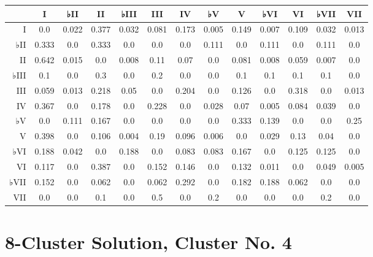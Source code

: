 \begin{table}[htbp]
\begin{minipage}{\linewidth}
\setlength{\tymax}{0.5\linewidth}
\centering
\small
\begin{tabulary}{\textwidth}{@{}RCCCCCCCCCCCC@{}} \toprule
&I&♭II&II&♭III&III&IV&♭V&V&♭VI&VI&♭VII&VII\\
\midrule
I&0.0&0.022&0.377&0.032&0.081&0.173&0.005&0.149&0.007&0.109&0.032&0.013\\
♭II&0.333&0.0&0.333&0.0&0.0&0.0&0.111&0.0&0.111&0.0&0.111&0.0\\
II&0.642&0.015&0.0&0.008&0.11&0.07&0.0&0.081&0.008&0.059&0.007&0.0\\
♭III&0.1&0.0&0.3&0.0&0.2&0.0&0.0&0.1&0.1&0.1&0.1&0.0\\
III&0.059&0.013&0.218&0.05&0.0&0.204&0.0&0.126&0.0&0.318&0.0&0.013\\
IV&0.367&0.0&0.178&0.0&0.228&0.0&0.028&0.07&0.005&0.084&0.039&0.0\\
♭V&0.0&0.111&0.167&0.0&0.0&0.0&0.0&0.333&0.139&0.0&0.0&0.25\\
V&0.398&0.0&0.106&0.004&0.19&0.096&0.006&0.0&0.029&0.13&0.04&0.0\\
♭VI&0.188&0.042&0.0&0.188&0.0&0.083&0.083&0.167&0.0&0.125&0.125&0.0\\
VI&0.117&0.0&0.387&0.0&0.152&0.146&0.0&0.132&0.011&0.0&0.049&0.005\\
♭VII&0.152&0.0&0.062&0.0&0.062&0.292&0.0&0.182&0.188&0.062&0.0&0.0\\
VII&0.0&0.0&0.1&0.0&0.5&0.0&0.2&0.0&0.0&0.0&0.2&0.0\\

\bottomrule

\end{tabulary}
\end{minipage}
\end{table}

\section{8-Cluster Solution, Cluster No. 4}
\label{8-clustersolutionclusterno.4}

